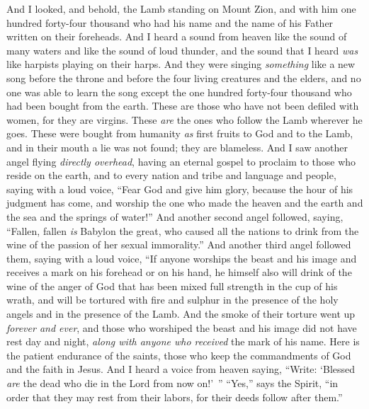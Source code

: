 \begin{biblechapter} %
 And I looked, and behold, the Lamb standing on Mount Zion, and with him one hundred forty-four thousand who had his name and the name of his Father written on their foreheads.
\verse And I heard a sound from heaven like the sound of many waters and like the sound of loud thunder, and the sound that I heard \textit{was} like harpists playing on their harps.
\verse And they were singing \textit{something} like a new song before the throne and before the four living creatures and the elders, and no one was able to learn the song except the one hundred forty-four thousand who had been bought from the earth.
\verse These are those who have not been defiled with women, for they are virgins. These \textit{are} the ones who follow the Lamb wherever he goes. These were bought from humanity \textit{as} first fruits to God and to the Lamb,
\verse and in their mouth a lie was not found; they are blameless.
 And I saw another angel flying \textit{directly overhead}, having an eternal gospel to proclaim to those who reside on the earth, and to every nation and tribe and language and people,
\verse saying with a loud voice, “Fear God and give him glory, because the hour of his judgment has come, and worship the one who made the heaven and the earth and the sea and the springs of water!”
\verse And another second angel followed, saying, “Fallen, fallen \textit{is} Babylon the great, who caused all the nations to drink from the wine of the passion of her sexual immorality.”
\verse And another third angel followed them, saying with a loud voice, “If anyone worships the beast and his image and receives a mark on his forehead or on his hand,
\verse he himself also will drink of the wine of the anger of God that has been mixed full strength in the cup of his wrath, and will be tortured with fire and sulphur in the presence of the holy angels and in the presence of the Lamb.
\verse And the smoke of their torture went up \textit{forever and ever}, and those who worshiped the beast and his image did not have rest day and night, \textit{along with anyone who received} the mark of his name.
\verse Here is the patient endurance of the saints, those who keep the commandments of God and the faith in Jesus.
\verse And I heard a voice from heaven saying, “Write: ‘Blessed \textit{are} the dead who die in the Lord from now on!’ ” “Yes,” says the Spirit, “in order that they may rest from their labors, for their deeds follow after them.”

\end{biblechapter}
